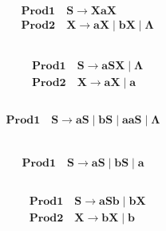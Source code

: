 \documentclass[12pt,a4paper,oneside]{report}
\begin{document}
\section{}
\subsection{}

\begin{equation}
\begin{split}
&\mathbf {Prod 1 \quad S \to  XaX }\\
&\mathbf {Prod 2 \quad X \to  aX \mid bX \mid \Lambda }
\end{split}
\end{equation}

\subsection{}

\begin{equation}
\begin{split}
&\mathbf {Prod 1 \quad  S \to  aSX\mid \Lambda}\\
&\mathbf {Prod 2 \quad  X\to  aX \mid a}
\end{split}
\end{equation}

\subsection{}

\begin{equation}
\mathbf {Prod 1 \quad  S\to  aS \mid bS \mid aaS \mid \Lambda}
\end{equation}

\section{}
\subsection{}
\begin{equation}
\mathbf {Prod 1 \quad  S \to aS \mid bS \mid a}
\end{equation}
\subsection{}
\begin{equation}
\begin{split}
&\mathbf {Prod 1 \quad  S \to aSb \mid bX}\\
&\mathbf{Prod 2 \quad X \to bX \mid b}
\end{split}
\end{equation}
\end{document}
